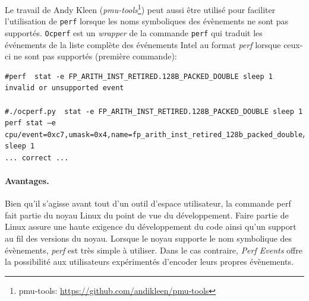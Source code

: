     
           Le travail de Andy Kleen (\textit{pmu-tools}\footnote{pmu-tools: \url{https://github.com/andikleen/pmu-tools}}) peut aussi être utilisé pour faciliter l'utilisation de \verb=perf= lorsque les noms symboliques des évènements ne sont pas supportés. \verb=Ocperf= est un \textit{wrapper} de la commande \verb=perf= qui traduit les événements de la liste complète des événements Intel au format \textit{perf} lorsque ceux-ci ne sont pas supportés (première commande):

\begin{verbatim}
#perf  stat -e FP_ARITH_INST_RETIRED.128B_PACKED_DOUBLE sleep 1
invalid or unsupported event

#./ocperf.py  stat -e FP_ARITH_INST_RETIRED.128B_PACKED_DOUBLE sleep 1
perf stat –e cpu/event=0xc7,umask=0x4,name=fp_arith_inst_retired_128b_packed_double/ sleep 1
... correct ...
\end{verbatim}
                
    
            \paragraph{Avantages.} Bien qu'il s'agisse avant tout d'un outil d'espace utilisateur, la commande perf fait partie du noyau Linux du point de vue du développement. Faire partie de Linux assure une haute exigence du développement du code ainsi qu'un support au fil des versions du noyau. Lorsque le noyau supporte le nom symbolique des évènements, \textit{perf} est très simple à utiliser. Dans le cas contraire, \textit{Perf Events} offre la possibilité aux utilisateurs expérimentés d'encoder leurs propres évènements.
            
    
